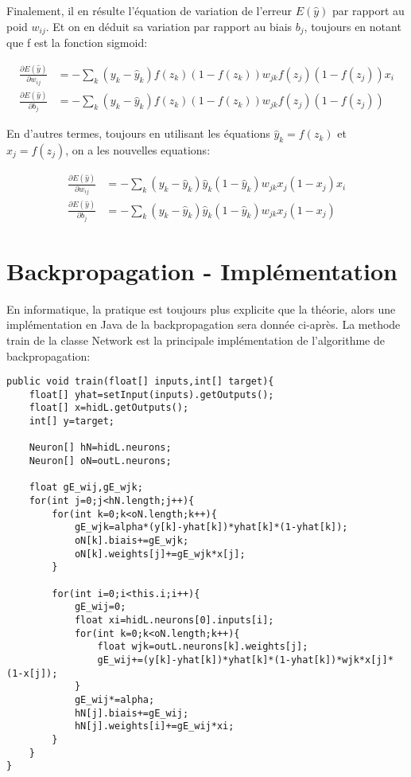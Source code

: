 \documentclass{article}
\begin{document}
Finalement, il en résulte l'équation de variation de l'erreur $E(\hat{y})$ par rapport au poid $w_{ij}$. Et on en déduit sa variation par rapport au biais $b_j$, toujours en notant que f est la fonction sigmoid:

\begin{align*}
\frac{\partial{E(\hat{y})}}{\partial{w_{ij}}}&=-\sum_k{(y_k-\hat{y}_k){f(z_k)(1-f(z_k))}w_{jk}{f(z_j)(1-f(z_j))}x_i}\\
\frac{\partial{E(\hat{y})}}{\partial{b_j}}&=-\sum_k{(y_k-\hat{y}_k){f(z_k)(1-f(z_k))}w_{jk}{f(z_j)(1-f(z_j))}}
\end{align*}

\newpage

En d'autres termes, toujours en utilisant les équations $\hat{y}_k=f(z_k)$ et $x_j=f(z_j)$, on a les nouvelles equations:

\begin{align*}
\frac{\partial{E(\hat{y})}}{\partial{w_{ij}}}&=-\sum_k{(y_k-\hat{y}_k){\hat{y}_k(1-\hat{y}_k)}w_{jk}{x_j(1-x_j)}x_i}\\
\frac{\partial{E(\hat{y})}}{\partial{b_j}}&=-\sum_k{(y_k-\hat{y}_k){\hat{y}_k(1-\hat{y}_k)}w_{jk}{x_j(1-x_j)}}
\end{align*}

\section{Backpropagation - Implémentation}

En informatique, la pratique est toujours plus explicite que la théorie, alors une implémentation en Java de la backpropagation sera donnée ci-après.
\smallbreak
La methode train de la classe Network est la principale implémentation de l'algorithme de backpropagation:

\begin{lstlisting}
public void train(float[] inputs,int[] target){
	float[] yhat=setInput(inputs).getOutputs();
	float[] x=hidL.getOutputs();
	int[] y=target;
		
	Neuron[] hN=hidL.neurons;
	Neuron[] oN=outL.neurons;
		
	float gE_wij,gE_wjk;
	for(int j=0;j<hN.length;j++){
		for(int k=0;k<oN.length;k++){
			gE_wjk=alpha*(y[k]-yhat[k])*yhat[k]*(1-yhat[k]);
			oN[k].biais+=gE_wjk;
			oN[k].weights[j]+=gE_wjk*x[j];
		}
	
		for(int i=0;i<this.i;i++){
			gE_wij=0;
			float xi=hidL.neurons[0].inputs[i];
			for(int k=0;k<oN.length;k++){
				float wjk=outL.neurons[k].weights[j];
				gE_wij+=(y[k]-yhat[k])*yhat[k]*(1-yhat[k])*wjk*x[j]*(1-x[j]);
			}
			gE_wij*=alpha;
			hN[j].biais+=gE_wij;
			hN[j].weights[i]+=gE_wij*xi;
		}
	}
}

\end{lstlisting}
\end{document}
